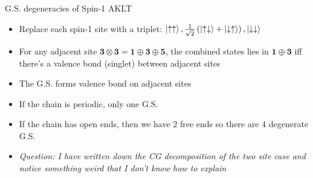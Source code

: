 \documentclass[aspectratio=169,xcolor=dvipsnames, t]{beamer}
\begin{document}




\begin{frame}{G.S. degeneracies of Spin-1 AKLT}
    \begin{itemize}
        \item Replace each spin-1 site with a triplet: $\ket{\uparrow\uparrow}, \frac{1}{\sqrt{2}}\left(\ket{\uparrow\downarrow}+\ket{\downarrow\uparrow}\right),\ket{\downarrow\downarrow}$
        \item For any adjacent site $\mathbf 3\otimes \mathbf3=\mathbf 1 \oplus \mathbf 3 \oplus \mathbf 5$, the combined states lies in $\mathbf 1 \oplus \mathbf 3$ iff there's a valence bond (singlet) between adjacent sites
        \item The G.S. forms valence bond on adjacent sites
        \item If the chain is periodic, only one G.S.
        \item If the chain has open ends, then we have 2 free ends so there are 4 degenerate G.S.
        \item \textit{Question: I have written down the CG decomposition of the two site case and notice something weird that I don't know how to explain}
    \end{itemize}
\end{frame}
\end{document}
